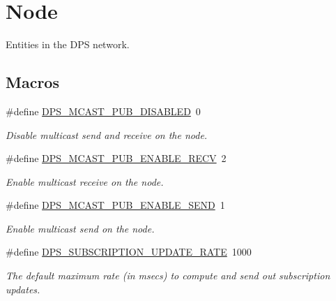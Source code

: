 \hypertarget{group__node}{}\section{Node}
\label{group__node}


Entities in the D\+PS network.  


\subsection*{Macros}
\begin{DoxyCompactItemize}
\item 
\#define \hyperlink{group__node_gac939c83361ed89086f37c78d9c9009dd}{D\+P\+S\+\_\+\+M\+C\+A\+S\+T\+\_\+\+P\+U\+B\+\_\+\+D\+I\+S\+A\+B\+L\+ED}~0
\begin{DoxyCompactList}\small\item\em Disable multicast send and receive on the node. \end{DoxyCompactList}\item 
\#define \hyperlink{group__node_gae493573fb2e02b87258952223eb4fcd7}{D\+P\+S\+\_\+\+M\+C\+A\+S\+T\+\_\+\+P\+U\+B\+\_\+\+E\+N\+A\+B\+L\+E\+\_\+\+R\+E\+CV}~2
\begin{DoxyCompactList}\small\item\em Enable multicast receive on the node. \end{DoxyCompactList}\item 
\#define \hyperlink{group__node_ga178a3a6450eeff450820fa34fd82049c}{D\+P\+S\+\_\+\+M\+C\+A\+S\+T\+\_\+\+P\+U\+B\+\_\+\+E\+N\+A\+B\+L\+E\+\_\+\+S\+E\+ND}~1
\begin{DoxyCompactList}\small\item\em Enable multicast send on the node. \end{DoxyCompactList}\item 
\mbox{\label{group__node_ga89df880f9650da5730fa152642c0be9f}} 
\#define \hyperlink{group__node_ga89df880f9650da5730fa152642c0be9f}{D\+P\+S\+\_\+\+S\+U\+B\+S\+C\+R\+I\+P\+T\+I\+O\+N\+\_\+\+U\+P\+D\+A\+T\+E\+\_\+\+R\+A\+TE}~1000
\begin{DoxyCompactList}\small\item\em The default maximum rate (in msecs) to compute and send out subscription updates. \end{DoxyCompactList}\end{DoxyCompactItemize}
